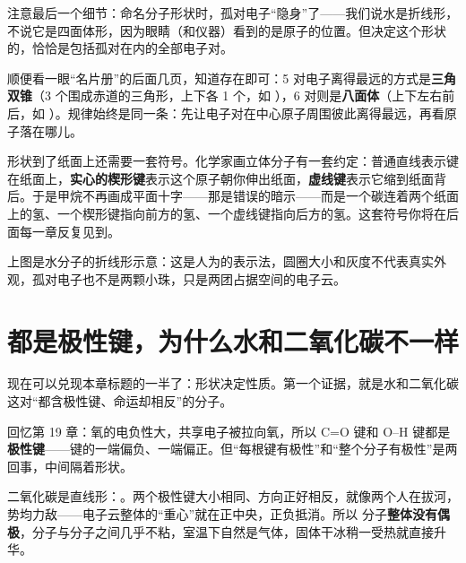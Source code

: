 注意最后一个细节：命名分子形状时，孤对电子“隐身”了——我们说水是折线形，不说它是四面体形，因为眼睛（和仪器）看到的是原子的位置。但决定这个形状的，恰恰是包括孤对在内的全部电子对。

顺便看一眼“名片册”的后面几页，知道存在即可：5 对电子离得最远的方式是\textbf{三角双锥}（3 个围成赤道的三角形，上下各 1 个，如 ），6 对则是\textbf{八面体}（上下左右前后，如 ）。规律始终是同一条：先让电子对在中心原子周围彼此离得最远，再看原子落在哪儿。

形状到了纸面上还需要一套符号。化学家画立体分子有一套约定：普通直线表示键在纸面上，\textbf{实心的楔形键}表示这个原子朝你伸出纸面，\textbf{虚线键}表示它缩到纸面背后。于是甲烷不再画成平面十字——那是错误的暗示——而是一个碳连着两个纸面上的氢、一个楔形键指向前方的氢、一个虚线键指向后方的氢。这套符号你将在后面每一章反复见到。


上图是水分子的折线形示意：这是人为的表示法，圆圈大小和灰度不代表真实外观，孤对电子也不是两颗小珠，只是两团占据空间的电子云。

\section{都是极性键，为什么水和二氧化碳不一样}

现在可以兑现本章标题的一半了：形状决定性质。第一个证据，就是水和二氧化碳这对“都含极性键、命运却相反”的分子。

回忆第 19 章：氧的电负性大，共享电子被拉向氧，所以 C=O 键和 O–H 键都是\textbf{极性键}——键的一端偏负、一端偏正。但“每根键有极性”和“整个分子有极性”是两回事，中间隔着形状。

二氧化碳是直线形：。两个极性键大小相同、方向正好相反，就像两个人在拔河，势均力敌——电子云整体的“重心”就在正中央，正负抵消。所以  分子\textbf{整体没有偶极}，分子与分子之间几乎不粘，室温下自然是气体，固体干冰稍一受热就直接升华。

